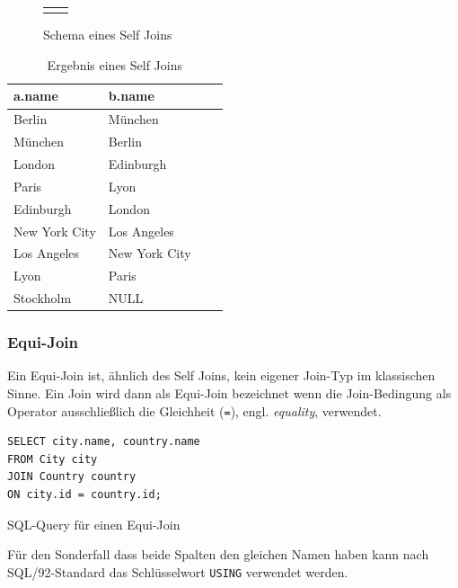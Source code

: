 \documentclass[a4paper]{article}
\begin{document}
\begin{minipage}{\textwidth}
\begin{minipage}[b]{0.49\textwidth}
\begin{figure}[H]
\begin{tabular}{| c | c |}
    \cellcolor{cell} & \cellcolor{cell-odd} \\ \hline
    \cellcolor{cell} & \\ \hline
  \end{tabular}
\caption{Schema eines Self Joins}
\end{figure}
\end{minipage}
\hfill
\begin{minipage}[b]{0.49\textwidth}
\begin{table}[H]
\centering
  \begin{tabular}{| l | l | l | l |}
    \hline
    a.name & b.name\\ \hline
    \hline
    Berlin & München \\ \hline
    München & Berlin \\ \hline
    London & Edinburgh \\ \hline
    Paris & Lyon \\ \hline
    Edinburgh & London \\ \hline
    New York City & Los Angeles \\ \hline
    Los Angeles & New York City \\ \hline
    Lyon & Paris \\ \hline
    Stockholm & NULL \\ \hline
  \end{tabular}
\caption{Ergebnis eines Self Joins}
\label{tab:self-join}
\end{table}
\end{minipage}
\end{minipage}

\newpage
\subsubsection{Equi-Join}
\label{sec:equi-join}
Ein Equi-Join ist, ähnlich des Self Joins, kein eigener Join-Typ im klassischen Sinne. Ein Join wird dann als Equi-Join bezeichnet wenn die Join-Bedingung als Operator ausschließlich die Gleichheit (\texttt{=}), engl. \textit{equality}, verwendet.

\begin{listing}[H]
\begin{verbatim}
SELECT city.name, country.name 
FROM City city
JOIN Country country 
ON city.id = country.id;
\end{verbatim}
\caption{SQL-Query für einen Equi-Join}
\label{lst:equi-join}
\end{listing}

Für den Sonderfall dass beide Spalten den gleichen Namen haben kann nach SQL/92-Standard das Schlüsselwort \texttt{USING} verwendet werden.
\end{document}
